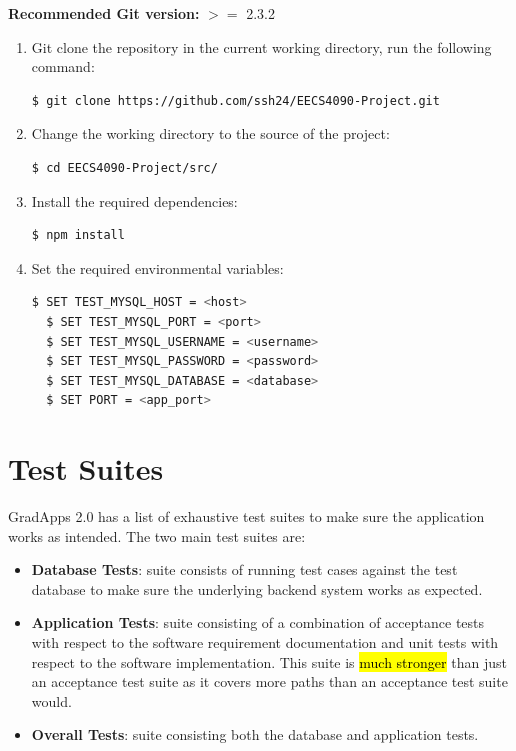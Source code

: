 \documentclass[fontsize=12pt,paper=letter,twoside]{scrartcl}
\begin{document}
\bigskip
\noindent \textbf{Recommended Git version:} $>=$ 2.3.2

\smallskip
\begin{enumerate}
\item Git clone the repository in the current working directory, run the following command:
\begin{lstlisting}[language=bash]
  $ git clone https://github.com/ssh24/EECS4090-Project.git
\end{lstlisting}
\item Change the working directory to the source of the project:
\begin{lstlisting}[language=bash]
  $ cd EECS4090-Project/src/
\end{lstlisting}
\item Install the required dependencies:
\begin{lstlisting}[language=bash]
  $ npm install
\end{lstlisting}
\item Set the required environmental variables:
\begin{lstlisting}[language=bash]
  $ SET TEST_MYSQL_HOST = <host>
  $ SET TEST_MYSQL_PORT = <port>
  $ SET TEST_MYSQL_USERNAME = <username>
  $ SET TEST_MYSQL_PASSWORD = <password>
  $ SET TEST_MYSQL_DATABASE = <database>
  $ SET PORT = <app_port>
\end{lstlisting}
\end{enumerate}


\newpage
\section{Test Suites}
GradApps 2.0 has a list of exhaustive test suites to make sure the application works as intended. The two main test suites are:

\begin{itemize}
\item \textbf{Database Tests}: suite consists of running test cases against the test database to make sure the underlying backend system works as expected.
\item \textbf{Application Tests}: suite consisting of a combination of acceptance tests with respect to the software requirement documentation and unit tests with respect to the software implementation. This suite is \hl{much stronger} than just an acceptance test suite as it covers more paths than an acceptance test suite would.
\item \textbf{Overall Tests}: suite consisting both the database and application tests.
\end{itemize}
\end{document}
